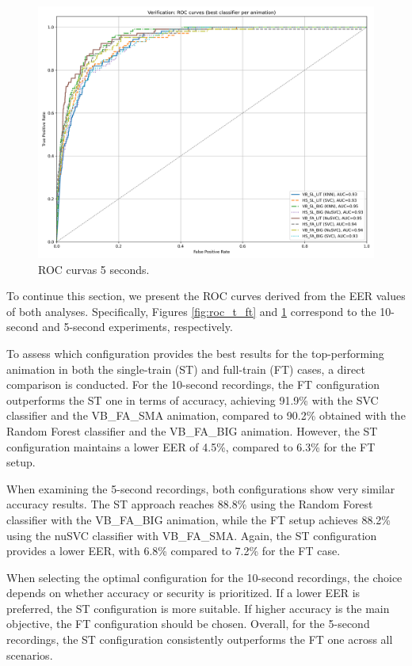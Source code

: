 \documentclass[12pt]{report}
\begin{document}
\begin{figure}[ht]
    \centering
    \includegraphics[width = 0.6
    \textwidth]{Images/Results/Verification_single_five_ten/ft/five/best_animation_roc_curves_five_ft.png}
    \caption{ROC curvas 5 seconds.}
    \label{fig:roc_f_ft}
\end{figure}

To continue this section, we present the ROC curves derived from the EER values of both analyses. 
Specifically, Figures \ref{fig:roc_t_ft} and \ref{fig:roc_f_ft} correspond to the 10-second and 5-second experiments, respectively.

To assess which configuration provides the best results for the top-performing animation in both the single-train (ST) and full-train (FT) cases, a direct comparison is conducted.
For the 10-second recordings, the FT configuration outperforms the ST one in terms of accuracy, achieving 91.9\% with the SVC classifier and the VB\_FA\_SMA animation, compared to 90.2\% obtained with the Random Forest classifier and the VB\_FA\_BIG animation.
However, the ST configuration maintains a lower EER of 4.5\%, compared to 6.3\% for the FT setup.

When examining the 5-second recordings, both configurations show very similar accuracy results. 
The ST approach reaches 88.8\% using the Random Forest classifier with the VB\_FA\_BIG animation, while the FT setup achieves 88.2\% using the nuSVC classifier with VB\_FA\_SMA.
Again, the ST configuration provides a lower EER, with 6.8\% compared to 7.2\% for the FT case.

When selecting the optimal configuration for the 10-second recordings, the choice depends on whether accuracy or security is prioritized. 
If a lower EER is preferred, the ST configuration is more suitable.
If higher accuracy is the main objective, the FT configuration should be chosen.
Overall, for the 5-second recordings, the ST configuration consistently outperforms the FT one across all scenarios.
\FloatBarrier
\end{document}

